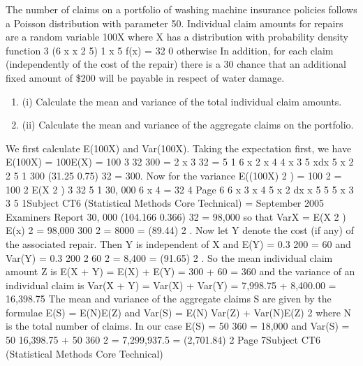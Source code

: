 \documentclass[a4paper,12pt]{article}
\begin{document}
 


The number of claims on a portfolio of washing machine insurance policies follows a
Poisson distribution with parameter 50. Individual claim amounts for repairs are a
random variable 100X where X has a distribution with probability density function
3
(6 x x 2 5) 1 x 5
f(x) = 32
0
otherwise
In addition, for each claim (independently of the cost of the repair) there is a 30%
chance that an additional fixed amount of \$200 will be payable in respect of water
damage.
\begin{enumerate}
\item (i) Calculate the mean and variance of the total individual claim amounts.
\item (ii) Calculate the mean and variance of the aggregate claims on the portfolio. 
\end{enumerate}

We first calculate E(100X) and Var(100X). Taking the expectation first, we have
E(100X) = 100E(X)
= 100
3
32
300
=
2 x 3
32
=
5
1
6 x 2
x 4
4
x 3 5 xdx
5 x 2
2
5
1
300
(31.25 0.75)
32
= 300.
Now for the variance
E((100X) 2 ) = 100 2
= 100 2
E(X 2 )
3
32
5
1
30, 000 6 x 4
=
32
4
Page 6
6 x 3 x 4 5 x 2 dx
x 5
5
5 x 3
3
5
1Subject CT6 (Statistical Methods Core Technical)
=
September 2005
Examiners Report
30, 000
(104.166 0.366)
32
= 98,000
so that
VarX = E(X 2 )
E(x) 2
= 98,000
300 2
= 8000
= (89.44) 2 .
Now let Y denote the cost (if any) of the associated repair. Then Y is independent of X
and
E(Y) = 0.3
200 = 60
and
Var(Y) = 0.3
200 2
60 2 = 8,400 = (91.65) 2 .
So the mean individual claim amount Z is
E(X + Y) = E(X) + E(Y) = 300 + 60 = 360
and the variance of an individual claim is
Var(X + Y) = Var(X) + Var(Y) = 7,998.75 + 8,400.00 = 16,398.75
The mean and variance of the aggregate claims S are given by the formulae
E(S) = E(N)E(Z)
and
Var(S) = E(N) Var(Z) + Var(N)E(Z) 2
where N is the total number of claims. In our case
E(S) = 50
360 = 18,000
and
Var(S) = 50
16,398.75 + 50
360 2 = 7,299,937.5 = (2,701.84) 2
Page 7Subject CT6 (Statistical Methods Core Technical)
\end{document}
